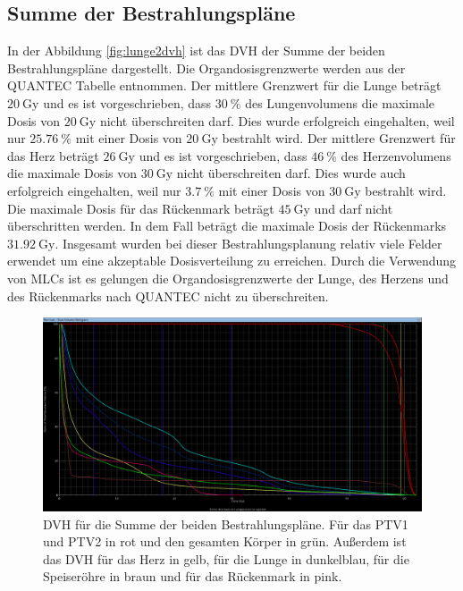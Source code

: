 \subsection{Summe der Bestrahlungspläne}
In der Abbildung \ref{fig:lunge2dvh} ist das DVH der Summe der beiden Bestrahlungspläne dargestellt. Die Organdosisgrenzwerte werden aus der QUANTEC Tabelle entnommen. Der mittlere Grenzwert für die Lunge beträgt $\SI{20}{\gray}$ und es ist vorgeschrieben, dass $\SI{30}{\percent}$ des Lungenvolumens die maximale Dosis von $\SI{20}{\gray}$ nicht überschreiten darf. Dies wurde erfolgreich eingehalten, weil nur $\SI{25.76}{\percent}$ mit einer Dosis von $\SI{20}{\gray}$ bestrahlt wird. 
Der mittlere Grenzwert für das Herz beträgt $\SI{26}{\gray}$ und es ist vorgeschrieben, dass $\SI{46}{\percent}$ des Herzenvolumens die maximale Dosis von $\SI{30}{\gray}$ nicht überschreiten darf. Dies wurde auch erfolgreich eingehalten, weil nur $\SI{3.7}{\percent}$ mit einer Dosis von $\SI{30}{\gray}$ bestrahlt wird. 
Die maximale Dosis für das Rückenmark beträgt $\SI{45}{\gray}$ und darf nicht überschritten werden. In dem Fall beträgt die maximale Dosis der Rückenmarks $\SI{31.92}{\gray}$.
Insgesamt wurden bei dieser Bestrahlungsplanung relativ viele Felder erwendet um eine akzeptable Dosisverteilung zu erreichen. Durch die Verwendung von MLCs ist es gelungen die Organdosisgrenzwerte der Lunge, des Herzens und des Rückenmarks nach QUANTEC nicht zu überschreiten.

\begin{figure}
	\centering
	\includegraphics[width=0.7\linewidth]{../../Bilder/Lunge_DVHsum}
	\caption{DVH für die Summe der beiden Bestrahlungspläne. Für das PTV1 und PTV2 in rot und den gesamten Körper in grün. Außerdem ist das DVH für das Herz in gelb, für die Lunge in dunkelblau, für die Speiseröhre in braun und für das Rückenmark in pink.}
	\label{fig:lungedvhsum}
\end{figure}

